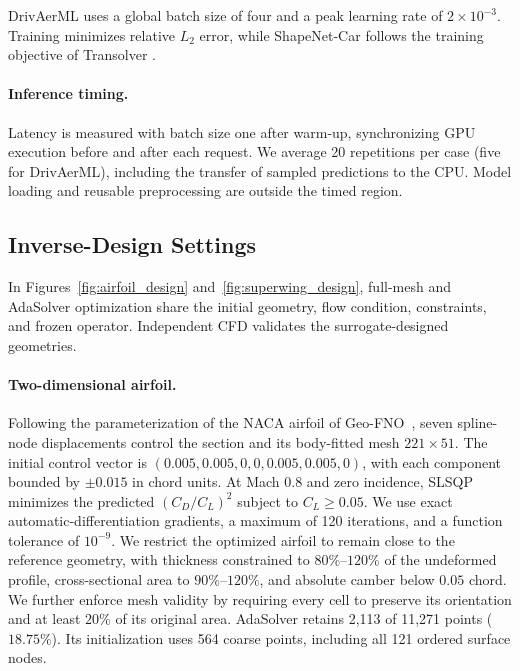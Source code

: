 \documentclass{article}
\begin{document}
DrivAerML uses a global batch size of four and a peak learning rate of \(2\times10^{-3}\). Training minimizes relative \(L_2\) error, while ShapeNet-Car follows the training objective of Transolver \citep{wu2024transolver}.

\paragraph{Inference timing.}
Latency is measured with batch size one after warm-up, synchronizing GPU
execution before and after each request. We average 20 repetitions per
case (five for DrivAerML), including the transfer of sampled predictions
to the CPU. Model loading and reusable preprocessing are outside the
timed region.

\subsection{Inverse-Design Settings}
\label{app:inverse_design_settings}

In Figures~\ref{fig:airfoil_design} and~\ref{fig:superwing_design}, full-mesh and AdaSolver optimization share the initial geometry, flow condition, constraints, and frozen operator. Independent CFD validates the surrogate-designed geometries.

\paragraph{Two-dimensional airfoil.}
Following the parameterization of the NACA airfoil of Geo-FNO~\citep{li2023geofno}, seven spline-node displacements control the section and its body-fitted mesh $221\times51$. The initial control vector is $(0.005,0.005,0,0,0.005,0.005,0)$, with each component bounded by $\pm0.015$ in chord units. At Mach $0.8$ and zero incidence, SLSQP minimizes the predicted $(C_D/C_L)^2$ subject to $C_L\geq0.05$. We use exact automatic-differentiation gradients, a maximum of 120 iterations, and a function tolerance of $10^{-9}$. We restrict the optimized airfoil to remain close to the reference geometry, with thickness constrained to \(80\%\)–\(120\%\) of the undeformed profile, cross-sectional area to \(90\%\)–\(120\%\), and absolute camber below \(0.05\) chord. We further enforce mesh validity by requiring every cell to preserve its orientation and at least \(20\%\) of its original area. AdaSolver retains 2,113 of 11,271 points ($18.75\%$). Its initialization uses 564 coarse points, including all 121 ordered surface nodes. 
\end{document}
